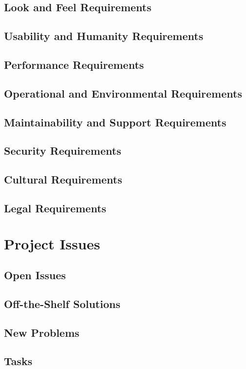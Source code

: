 \documentclass{article}
\begin{document}
		\subsection{Look and Feel Requirements}
		\subsection{Usability and Humanity Requirements}
		\subsection{Performance Requirements}
		\subsection{Operational and Environmental Requirements}
		\subsection{Maintainability and Support Requirements}
		\subsection{Security Requirements}
		\subsection{Cultural Requirements}
		\subsection{Legal Requirements}
		
	\section{Project Issues}
		\subsection{Open Issues}
		\subsection{Off-the-Shelf Solutions}
		\subsection{New Problems}
		\subsection{Tasks}
\end{document}
